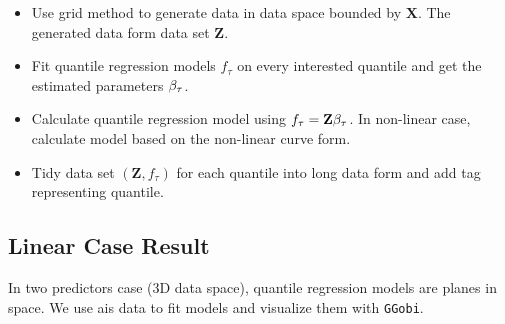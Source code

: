 \documentclass[11pt,a4paper,]{article}
\theoremstyle{definition}
\theoremstyle{definition}
\theoremstyle{remark}
\begin{document}
\begin{itemize}
\item
  Use grid method to generate data in data space bounded by
  \(\boldsymbol{X}\). The generated data form data set
  \(\boldsymbol{Z}\).
\item
  Fit quantile regression models \(f_{\tau}\) on every interested
  quantile and get the estimated parameters \(\bold{\beta}_{\tau}\).
\item
  Calculate quantile regression model using
  \(f_{\tau} = \bold{Z}\bold{\beta}_{\tau}\). In non-linear case,
  calculate model based on the non-linear curve form.
\item
  Tidy data set \((\boldsymbol{Z}, f_{\tau})\) for each quantile into
  long data form and add tag representing quantile.
\end{itemize}

\subsection{Linear Case Result}\label{linear-case-result}

In two predictors case (3D data space), quantile regression models are
planes in space. We use ais data to fit models and visualize them with
\texttt{GGobi}.
\end{document}
